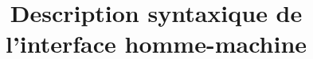 

\title{Description syntaxique de l'interface homme-machine}



\maketitle
\tableofcontents
\newpage


